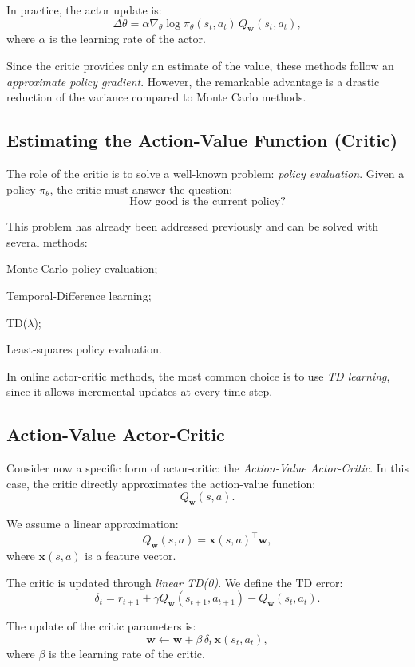 In practice, the actor update is:
\[
\Delta \theta
= \alpha \nabla_\theta \log \pi_\theta(s_t,a_t)\, Q_{\mathbf{w}}(s_t,a_t),
\]
where $\alpha$ is the learning rate of the actor.

Since the critic provides only an estimate of the value, these methods follow an \emph{approximate policy gradient}. However, the remarkable advantage is a drastic reduction of the variance compared to Monte Carlo methods.

\subsection{Estimating the Action-Value Function (Critic)}

The role of the critic is to solve a well-known problem: \emph{policy evaluation}. Given a policy $\pi_\theta$, the critic must answer the question:
\[
\text{How good is the current policy?}
\]

This problem has already been addressed previously and can be solved with several methods:
\begin{compactitemize}
    \item Monte-Carlo policy evaluation;
    \item Temporal-Difference learning;
    \item TD($\lambda$);
    \item Least-squares policy evaluation.
\end{compactitemize}

In online actor-critic methods, the most common choice is to use \emph{TD learning}, since it allows incremental updates at every time-step.

\subsection{Action-Value Actor-Critic}

Consider now a specific form of actor-critic: the \emph{Action-Value Actor-Critic}. In this case, the critic directly approximates the action-value function:
\[
Q_{\mathbf{w}}(s,a).
\]

We assume a linear approximation:
\[
Q_{\mathbf{w}}(s,a) = \mathbf{x}(s,a)^\top \mathbf{w},
\]
where $\mathbf{x}(s,a)$ is a feature vector.

The critic is updated through \emph{linear TD(0)}. We define the TD error:
\[
\delta_t
= r_{t+1}
+ \gamma Q_{\mathbf{w}}(s_{t+1},a_{t+1})
- Q_{\mathbf{w}}(s_t,a_t).
\]

The update of the critic parameters is:
\[
\mathbf{w}
\leftarrow
\mathbf{w}
+ \beta\, \delta_t\, \mathbf{x}(s_t,a_t),
\]
where $\beta$ is the learning rate of the critic.


